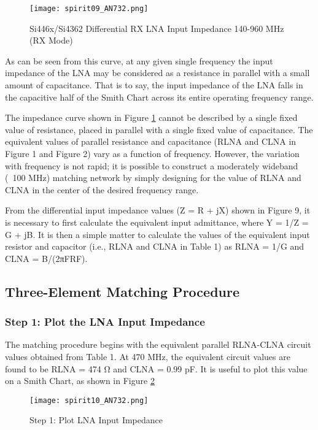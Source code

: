       \begin{figure}[ht!]  %
        \centering
        \texttt{[image: spirit09\_AN732.png]}
        \caption{Si446x/Si4362 Differential RX LNA Input Impedance 140-960 MHz (RX Mode)}
        \label{EXP001:fig_spirit09}
      \end{figure}
       
      As can be seen from this curve, at any given single frequency the input impedance of the LNA may be 
      considered as a resistance in parallel with a small amount of capacitance. That is to say, the input 
      impedance of the LNA falls in the capacitive half of the Smith Chart across its entire operating 
      frequency range.
      
      The impedance curve shown in Figure \ref{EXP001:fig_spirit09} cannot be described by a single fixed 
      value of resistance, placed in parallel with a single fixed value of capacitance. The equivalent values 
      of  parallel resistance and capacitance (RLNA and CLNA in Figure 1 and Figure 2) vary as a function of 
      frequency. However, the variation with frequency is not rapid; it is possible to construct a moderately 
      wideband (~100 MHz) matching network by simply designing for the value of RLNA and CLNA in the center 
      of the desired frequency range.
      
      From the differential input impedance values (Z = R + jX) shown in Figure 9, it is necessary to first 
      calculate the equivalent input admittance, where Y = 1/Z = G + jB. It is then a simple matter to 
      calculate the values of the equivalent input resistor and capacitor (i.e., RLNA and CLNA in Table 1) as 
      RLNA = 1/G and CLNA = B/(2πFRF).
     
    \subsection{Three-Element Matching Procedure}
      \subsubsection{Step 1: Plot the LNA Input Impedance}
        The matching procedure begins with the equivalent parallel RLNA-CLNA circuit values obtained from 
        Table 1. At 470 MHz, the equivalent circuit values are found to be RLNA = 474 Ω and CLNA = 0.99 pF. 
        It is useful to plot this value on a Smith Chart, as shown in Figure \ref{EXP001:fig_spirit10}
        \begin{figure}[ht!]  %
          \centering
          \texttt{[image: spirit10\_AN732.png]}
          \caption{Step 1: Plot LNA Input Impedance}
          \label{EXP001:fig_spirit10}
        \end{figure}
